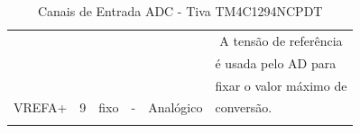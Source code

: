 \begin{center}
\begin{longtable}{|c|c|c|c|c|c|}
	\hline
	&                                &                                   &                             &                               & A tensão de referência                      \\
	&                                &                                   &                             &                               & \multicolumn{1}{l|}{é usada pelo AD para}    \\
	&                                &                                   &                             &                               & \multicolumn{1}{l|}{fixar o valor máximo de} \\
	\multirow{-4}{*}{VREFA+}    & \multirow{-4}{*}{9}            & \multirow{-4}{*}{fixo}            & \multirow{-4}{*}{-}         & \multirow{-4}{*}{Analógico}   & \multicolumn{1}{l|}{conversão.}  \\ 
	\hline
	\caption{Canais de Entrada ADC - Tiva TM4C1294NCPDT \cite{DATASHEET_TIVA} }
	\label{tab:CanaisADC}
\end{longtable}
\end{center}
